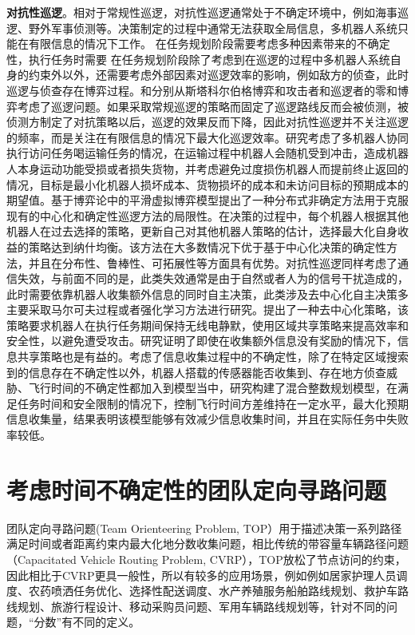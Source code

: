 \documentclass[finalformat,mathCMR]{HUSTthesis}
\begin{document}
\textbf{对抗性巡逻}。相对于常规性巡逻，对抗性巡逻通常处于不确定环境中，例如海事巡逻、野外军事侦测等。决策制定的过程中通常无法获取全局信息，多机器人系统只能在有限信息的情况下工作。   在任务规划阶段需要考虑多种因素带来的不确定性，执行任务时需要
在任务规划阶段除了考虑到在巡逻的过程中多机器人系统自身的约束外以外，还需要考虑外部因素对巡逻效率的影响，例如敌方的侦查，此时巡逻与侦查存在博弈过程。\citep{alpernPatrollingGames2011}和\citep{alpernContinuousPatrollingGames2022a}分别从斯塔科尔伯格博弈和攻击者和巡逻者的零和博弈考虑了巡逻问题。如果采取常规巡逻的策略而固定了巡逻路线反而会被侦测，被侦测方制定了对抗策略以后，巡逻的效果反而下降，因此对抗性巡逻并不关注巡逻的频率，而是关注在有限信息的情况下最大化巡逻效率\citep{huangSurveyMultirobotRegular2019}。\citep{zhuOptimalRoutingLoading2020}研究考虑了多机器人协同执行访问任务喝运输任务的情况，在运输过程中机器人会随机受到冲击，造成机器人本身运动功能受损或者损失货物，并考虑避免过度损伤机器人而提前终止返回的情况，目标是最小化机器人损坏成本、货物损坏的成本和未访问目标的预期成本的期望值。\citep{hernandezSelectiveSmoothFictitious2014}基于博弈论中的平滑虚拟博弈模型提出了一种分布式非确定方法用于克服现有的中心化和确定性巡逻方法的局限性。在决策的过程中，每个机器人根据其他机器人在过去选择的策略，更新自己对其他机器人策略的估计，选择最大化自身收益的策略达到纳什均衡。该方法在大多数情况下优于基于中心化决策的确定性方法，并且在分布性、鲁棒性、可拓展性等方面具有优势。对抗性巡逻同样考虑了通信失效，与前面不同的是，此类失效通常是由于自然或者人为的信号干扰造成的，此时需要依靠机器人收集额外信息的同时自主决策，此类涉及去中心化自主决策多主要采取马尔可夫过程或者强化学习方法进行研究\citep{linGraphPatrolProblem2013, leeMultiagentReinforcementLearning2021,  huMOMIXMultiObjectiveMultiAgent2023}。\citep{xiaControllingFleetUnmanned2017a}提出了一种去中心化策略，该策略要求机器人在执行任务期间保持无线电静默，使用区域共享策略来提高效率和安全性，以避免遭受攻击。研究证明了即使在收集额外信息没有奖励的情况下，信息共享策略也是有益的。\citep{moskalUnmannedAerialVehicle2023}考虑了信息收集过程中的不确定性，除了在特定区域搜索到的信息存在不确定性以外，机器人搭载的传感器能否收集到、存在地方侦查威胁、飞行时间的不确定性都加入到模型当中，研究构建了混合整数规划模型，在满足任务时间和安全限制的情况下，控制飞行时间方差维持在一定水平，最大化预期信息收集量，结果表明该模型能够有效减少信息收集时间，并且在实际任务中失败率较低。

\section{考虑时间不确定性的团队定向寻路问题}
团队定向寻路问题(Team Orienteering Problem, TOP）用于描述决策一系列路径满足时间或者距离约束内最大化地分数收集问题，相比传统的带容量车辆路径问题（Capacitated Vehicle Routing Problem, CVRP），TOP放松了节点访问的约束，因此相比于CVRP更具一般性，所以有较多的应用场景，例如例如居家护理人员调度、农药喷洒任务优化、选择性配送调度、水产养殖服务船舶路线规划、救护车路线规划、旅游行程设计、移动采购员问题、军用车辆路线规划等，针对不同的问题，“分数”有不同的定义。
\end{document}
